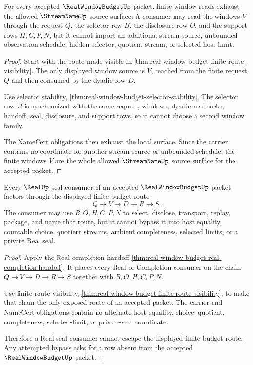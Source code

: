 \begin{theorem}
\label{thm:realwindowbudget-finite-window-source-exhaustion}
For every accepted $\RealWindowBudgetUp$ packet, finite window reads exhaust the
allowed $\StreamNameUp$ source surface. A consumer may read the windows $V$
through the request $Q$, the selector row $B$, the disclosure row $O$, and the
support rows $H,C,P,N$, but it cannot import an additional stream source,
unbounded observation schedule, hidden selector, quotient stream, or selected
host limit.
\end{theorem}
\begin{proof}
Start with the route made visible in
\autoref{thm:real-window-budget-finite-route-visibility}. The only displayed
window source is $V$, reached from the finite request $Q$ and then consumed by
the dyadic row $D$.

Use selector stability, \autoref{thm:real-window-budget-selector-stability}.
The selector row $B$ is synchronized with the same request, windows, dyadic
readbacks, handoff, seal, disclosure, and support rows, so it cannot choose a
second window family.

The NameCert obligations then exhaust the local surface. Since the carrier
contains no coordinate for another stream source or unbounded schedule, the
finite windows $V$ are the whole allowed $\StreamNameUp$ source surface for
the accepted packet.
\end{proof}

\begin{theorem}
\label{thm:realwindowbudget-real-seal-nonescape}
Every $\RealUp$ seal consumer of an accepted $\RealWindowBudgetUp$ packet
factors through the displayed finite budget route
$$
Q \to V \to D \to R \to S.
$$
The consumer may use $B,O,H,C,P,N$ to select, disclose, transport, replay,
package, and name that route, but it cannot bypass it into host equality,
countable choice, quotient streams, ambient completeness, selected limits, or
a private Real seal.
\end{theorem}
\begin{proof}
Apply the Real-completion handoff
\autoref{thm:real-window-budget-real-completion-handoff}. It places every
Real or Completion consumer on the chain $Q \to V \to D \to R \to S$ together
with $B,O,H,C,P,N$.

Use finite-route visibility,
\autoref{thm:real-window-budget-finite-route-visibility}, to make that chain
the only exposed route of an accepted packet. The carrier and NameCert
obligations contain no alternate host equality, choice, quotient, completeness,
selected-limit, or private-seal coordinate.

Therefore a Real-seal consumer cannot escape the displayed finite budget route.
Any attempted bypass asks for a row absent from the accepted
$\RealWindowBudgetUp$ packet.
\end{proof}

